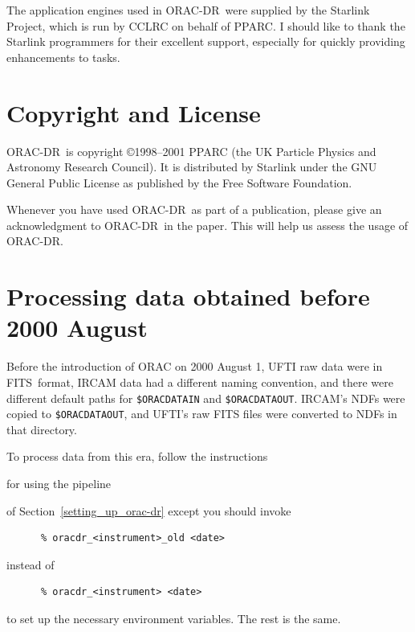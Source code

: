 \documentclass[twoside,11pt]{article}
\newcommand{\htmladdnormallink}[2]{#1}
\newcommand{\htmlref}[2]{#1}
\newenvironment{latexonly}{}{}
\newcommand{\xlabel}[1]{}
\renewcommand{\_}{\texttt{\symbol{95}}}
\newcommand{\ORACDR}{{\footnotesize ORAC-DR}}
\newcommand{\FITSref}{\htmladdnormallink{FITS}{http://fits.gsfc.nasa.gov/}}
\begin{document}
The application engines used in \ORACDR\ were supplied by the Starlink
Project, which is run by CCLRC on behalf of PPARC.  I should like to
thank the Starlink programmers for their excellent support, especially
for quickly providing enhancements to tasks.

\section{Copyright and License}

\ORACDR\ is copyright \copyright 1998--2001 PPARC (the UK Particle Physics
and Astronomy Research Council).  It is distributed by Starlink
under the GNU General Public License as published by the Free Software
Foundation.

Whenever you have used \ORACDR\ as part of a publication, please give
an acknowledgment to \ORACDR\ in the paper.  This will help us assess
the usage of \ORACDR.

\newpage
\appendix
\section{\xlabel{processing_data_obtained_before_2000_august}Processing data obtained before 2000 August\label{
processing_data_obtained_before_2000_august}}%

Before the introduction of
\htmladdnormallink{ORAC}{http://www.stsci.edu/stsci/meetings/adassVII/bridgera.html}
on 2000 August 1, UFTI raw data were in \FITSref\ format, IRCAM data had a
different naming convention, and there were different default paths for
{\tt\$ORAC\_DATA\_IN} and {\tt\$ORAC\_DATA\_OUT}.  IRCAM's NDFs were
copied to {\tt \$ORAC\_DATA\_OUT}, and UFTI's raw FITS files were
converted to NDFs in that directory.

To process data from this era, follow the instructions 
\begin{htmlonly}
\htmlref{for using the pipeline}{setting_up_orac-dr}
\end{htmlonly}
\begin{latexonly}
of Section~\ref{setting_up_orac-dr}
\end{latexonly}
except you should invoke 
\begin{verbatim}
      % oracdr_<instrument>_old <date>
\end{verbatim}
instead of
\begin{verbatim}
      % oracdr_<instrument> <date>
\end{verbatim}
to set up the necessary environment variables.  The rest is the same.
\end{document}
